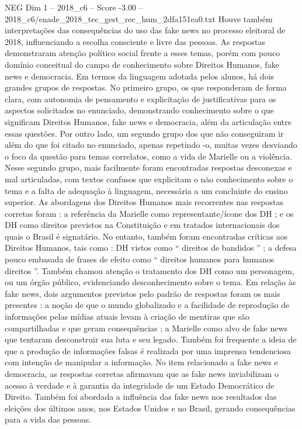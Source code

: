 \begin{textsample}{NEG Dim 1 – 2018\_c6 – Score -3.00 – 2018\_c6/enade\_2018\_tec\_gest\_rec\_hum\_2dfa151ea0.txt}
Houve também interpretações das consequências do uso das fake news no processo eleitoral de 2018, influenciando a escolha consciente e livre das pessoas.
As respostas demonstraram atenção político social frente a esses temas, porém com pouco domínio conceitual do campo de conhecimento sobre Direitos Humanos, fake news e democracia.
Em termos da linguagem adotada pelos alunos, há dois grandes grupos de respostas.
No primeiro grupo, os que responderam de forma clara, com autonomia de pensamento e explicitação de justificativas para os aspectos solicitados no enunciado, demonstrando conhecimento sobre o que significam Direitos Humanos, fake news e democracia, além da articulação entre essas questões.
Por outro lado, um segundo grupo dos que não conseguiram ir além do que foi citado no enunciado, apenas repetindo -o, muitas vezes desviando o foco da questão para temas correlatos, como a vida de Marielle ou a violência.
Nesse segundo grupo, mais facilmente foram encontradas respostas desconexas e mal articuladas, com textos confusos que explicitam o não conhecimento sobre o tema e a falta de adequação à linguagem, necessária a um concluinte do ensino superior.
As abordagens dos Direitos Humanos mais recorrentes nas respostas corretas foram : a referência da Marielle como representante/ícone dos DH ; e os DH como direitos previstos na Constituição e em tratados internacionais dos quais o Brasil é signatário.
No entanto, também foram encontradas críticas aos Direitos Humanos, tais como : DH vistos como “ direitos de bandidos ” ; a defesa pouco embasada de frases de efeito como “ direitos humanos para humanos direitos ”.
Também chamou atenção o tratamento dos DH como um personagem, ou um órgão público, evidenciando desconhecimento sobre o tema.
Em relação às fake news, dois argumentos previstos pelo padrão de respostas foram os mais presentes : a noção de que o mundo globalizado e a facilidade de reprodução de informações pelas mídias atuais levam à criação de mentiras que são compartilhadas e que geram consequências ; a Marielle como alvo de fake news que tentaram desconstruir sua luta e seu legado.
Também foi frequente a ideia de que a produção de informações falsas é realizada por uma imprensa tendenciosa com intenção de manipular a informação.
No item relacionado a fake news e democracia, as respostas corretas afirmavam que as fake news inviabilizam o acesso à verdade e à garantia da integridade de um Estado Democrático de Direito.
Também foi abordada a influência das fake news nos resultados das eleições dos últimos anos, nos Estados Unidos e no Brasil, gerando consequências para a vida das pessoas.

\end{textsample}
